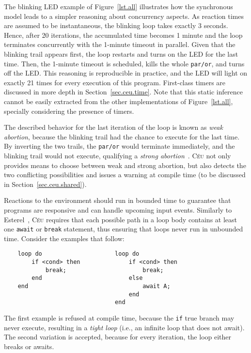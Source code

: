 \documentclass[10pt]{sensys-proc}
\newcommand{\CEU}{\textsc{C\'{e}u}\xspace}
\newcommand{\code}[1] {{\small{\texttt{#1}}}}
\begin{document}
The blinking LED example of Figure~\ref{lst.all} illustrates how the 
synchronous model leads to a simpler reasoning about concurrency aspects.
As reaction times are assumed to be instantaneous, the blinking loop takes 
exactly 3 seconds.
Hence, after 20 iterations, the accumulated time becomes 1 minute and the loop 
terminates concurrently with the 1-minute timeout in parallel.
Given that the blinking trail appears first, the loop restarts and turns on the 
LED for the last time.
Then, the 1-minute timeout is scheduled, kills the whole \code{par/or}, and 
turns off the LED.
%
This reasoning is reproducible in practice, and the LED will light on exactly 
21 times for every execution of this program.
First-class timers are discussed in more depth in Section~\ref{sec.ceu.time}.
%
Note that this static inference cannot be easily extracted from the other 
implementations of Figure~\ref{lst.all}, specially considering the presence of 
timers.

The described behavior for the last iteration of the loop is known as 
\emph{weak abortion}, because the blinking trail had the chance to execute for 
the last time.
By inverting the two trails, the \code{par/or} would terminate immediately, and 
the blinking trail would not execute, qualifying a \emph{strong 
abortion}~\cite{esterel.preemption}.
%
\CEU not only provides means to choose between weak and strong abortion, but 
also detects the two conflicting possibilities and issues a warning at compile 
time (to be discussed in Section~\ref{sec.ceu.shared}).

Reactions to the environment should run in bounded time to guarantee that 
programs are responsive and can handle upcoming input events.
Similarly to Esterel~\cite{esterel.ieee91}, \CEU requires that each possible 
path in a loop body contains at least one \code{await} or \code{break} 
statement, thus ensuring that loops never run in unbounded time.
%
Consider the examples that follow:

{\small
\begin{verbatim}
    loop do                     loop do
        if <cond> then              if <cond> then
            break;                      break;
        end                         else
    end                                 await A;
                                    end
                                end
\end{verbatim}
}

The first example is refused at compile time, because the \code{if} true branch 
may never execute, resulting in a \emph{tight loop} (i.e., an infinite loop 
that does not await).
The second variation is accepted, because for every iteration, the loop either 
breaks or awaits.
\end{document}
